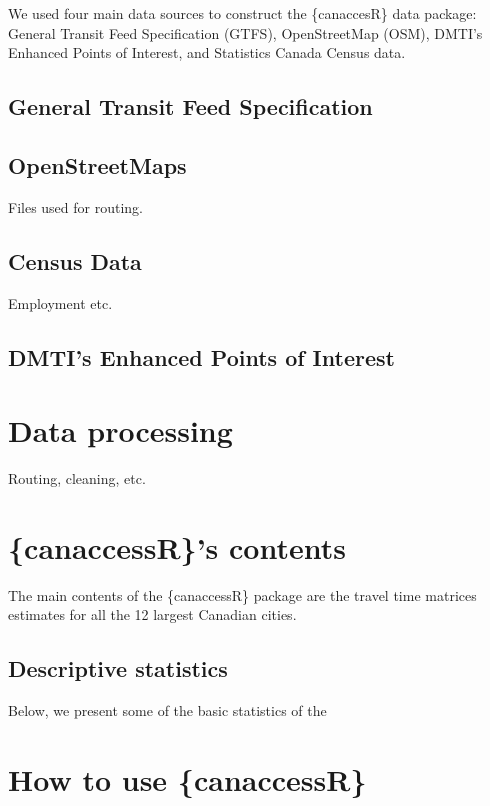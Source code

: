 \documentclass[Royal,times,sageh]{sagej}
\begin{document}
We used four main data sources to construct the \{canaccesR\} data
package: General Transit Feed Specification (GTFS), OpenStreetMap (OSM),
DMTI's Enhanced Points of Interest, and Statistics Canada Census data.

\subsection{General Transit Feed
Specification}\label{general-transit-feed-specification}

\subsection{OpenStreetMaps}\label{openstreetmaps}

Files used for routing.

\subsection{Census Data}\label{census-data}

Employment etc.

\subsection{DMTI's Enhanced Points of
Interest}\label{dmtis-enhanced-points-of-interest}

\section{Data processing}\label{data-processing}

Routing, cleaning, etc.

\section{\{canaccessR\}'s contents}\label{canaccessrs-contents}

The main contents of the \{canaccessR\} package are the travel time
matrices estimates for all the 12 largest Canadian cities.

\subsection{Descriptive statistics}\label{descriptive-statistics}

Below, we present some of the basic statistics of the

\section{How to use \{canaccessR\}}\label{how-to-use-canaccessr}
\end{document}

